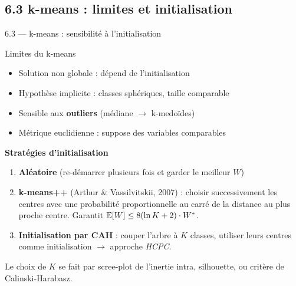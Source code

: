 \subsection{6.3 k-means : limites et initialisation}
\begin{frame}{6.3 — k-means : sensibilité à l'initialisation}
\begin{block}{Limites du k-means}
\begin{itemize}\small
  \item Solution \alert{non globale} : dépend de l'initialisation
  \item Hypothèse implicite : classes \alert{sphériques}, taille comparable
  \item Sensible aux \textbf{outliers} (médiane $\to$ k-medoïdes)
  \item Métrique euclidienne : suppose des variables comparables
\end{itemize}
\end{block}

\textbf{Stratégies d'initialisation}
\begin{enumerate}\small
  \item \textbf{Aléatoire} (re-démarrer plusieurs fois et garder le meilleur $W$)
  \item \textbf{k-means++} (Arthur \& Vassilvitskii, 2007) : choisir
        successivement les centres avec une probabilité proportionnelle au carré
        de la distance au plus proche centre. Garantit $\mathbb{E}[W] \leq 8(\ln K + 2) \cdot W^*$.
  \item \textbf{Initialisation par CAH} : couper l'arbre à $K$ classes,
        utiliser leurs centres comme initialisation $\to$ approche \emph{HCPC}.
\end{enumerate}

\begin{rema}
\small Le choix de $K$ se fait par scree-plot de l'inertie intra,
silhouette, ou critère de Calinski-Harabasz.
\end{rema}
\end{frame}

